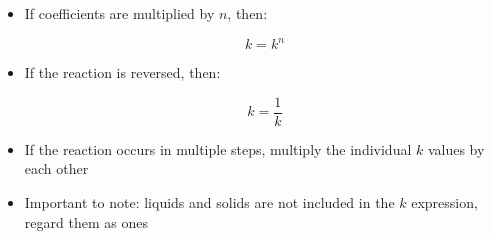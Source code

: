\documentclass[12pt]{article}
\begin{document}
\begin{itemize}
\begin{enumerate}
    \end{enumerate}

  \item If coefficients are multiplied by $n$, then:

    \begin{equation}
      k=k^n
      \label{2}
    \end{equation}

  \item If the reaction is reversed, then:

    \begin{equation}
      k=\frac{1}{k}
      \label{3}
    \end{equation}

  \item If the reaction occurs in multiple steps, multiply the individual $k$ values by each other

  \item Important to note: liquids and solids are not included in the $k$ expression, regard them as ones

\end{itemize}
\end{document}
